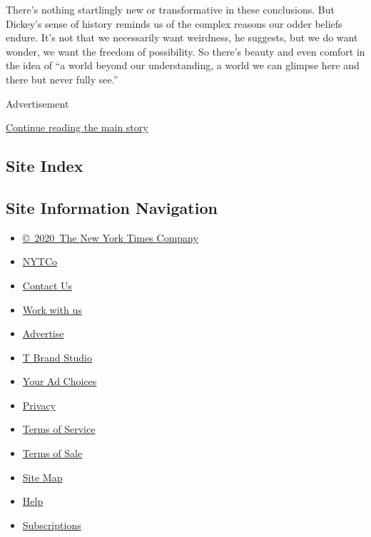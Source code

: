 There's nothing startlingly new or transformative in these conclusions.
But Dickey's sense of history reminds us of the complex reasons our
odder beliefs endure. It's not that we necessarily want weirdness, he
suggests, but we do want wonder, we want the freedom of possibility. So
there's beauty and even comfort in the idea of ``a world beyond our
understanding, a world we can glimpse here and there but never fully
see.''

Advertisement

\protect\hyperlink{after-bottom}{Continue reading the main story}

\hypertarget{site-index}{%
\subsection{Site Index}\label{site-index}}

\hypertarget{site-information-navigation}{%
\subsection{Site Information
Navigation}\label{site-information-navigation}}

\begin{itemize}
\tightlist
\item
  \href{https://help.nytimes3xbfgragh.onion/hc/en-us/articles/115014792127-Copyright-notice}{©~2020~The
  New York Times Company}
\end{itemize}

\begin{itemize}
\tightlist
\item
  \href{https://www.nytco.com/}{NYTCo}
\item
  \href{https://help.nytimes3xbfgragh.onion/hc/en-us/articles/115015385887-Contact-Us}{Contact
  Us}
\item
  \href{https://www.nytco.com/careers/}{Work with us}
\item
  \href{https://nytmediakit.com/}{Advertise}
\item
  \href{http://www.tbrandstudio.com/}{T Brand Studio}
\item
  \href{https://www.nytimes3xbfgragh.onion/privacy/cookie-policy\#how-do-i-manage-trackers}{Your
  Ad Choices}
\item
  \href{https://www.nytimes3xbfgragh.onion/privacy}{Privacy}
\item
  \href{https://help.nytimes3xbfgragh.onion/hc/en-us/articles/115014893428-Terms-of-service}{Terms
  of Service}
\item
  \href{https://help.nytimes3xbfgragh.onion/hc/en-us/articles/115014893968-Terms-of-sale}{Terms
  of Sale}
\item
  \href{https://spiderbites.nytimes3xbfgragh.onion}{Site Map}
\item
  \href{https://help.nytimes3xbfgragh.onion/hc/en-us}{Help}
\item
  \href{https://www.nytimes3xbfgragh.onion/subscription?campaignId=37WXW}{Subscriptions}
\end{itemize}

